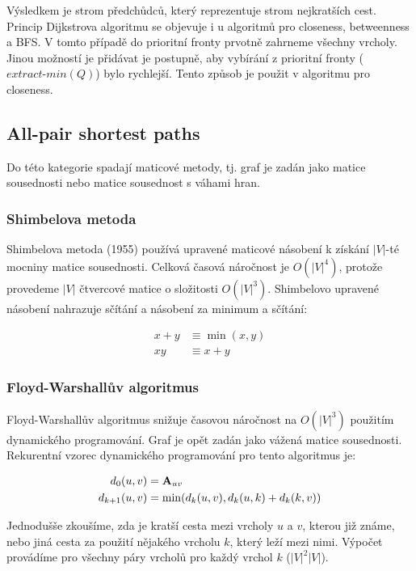 \documentclass[12pt,titlepage]{report}
\begin{document}
Výsledkem je strom předchůdců, který reprezentuje strom nejkratších cest.
Princip Dijkstrova algoritmu se objevuje i u algoritmů pro closeness,
betweenness a BFS. V tomto případě do prioritní fronty prvotně zahrneme všechny
vrcholy. Jinou možností je přidávat je postupně, aby vybírání z prioritní
fronty ($extract\mbox{-}min(Q)$) bylo rychlejší. Tento způsob je použit v
algoritmu pro closeness.


\subsection{All-pair shortest paths}
Do této kategorie spadají maticové metody, tj. graf je zadán jako matice
sousednosti nebo matice sousednost s váhami hran.


\subsubsection{Shimbelova metoda}
Shimbelova metoda (1955) používá upravené maticové násobení k získání $|V|$-té
mocniny matice sousednosti. Celková časová náročnost je $O(|V|^4)$, protože
provedeme $|V|$  čtvercové matice o složitosti $O(|V|^3)$.
Shimbelovo upravené násobení nahrazuje sčítání a násobení za minimum a sčítání:

\begin{align*}
x + y &\equiv \min(x, y) \\
xy &\equiv x + y
\end{align*}

\subsubsection{Floyd-Warshallův algoritmus}
Floyd-Warshallův algoritmus snižuje časovou náročnost na $O(|V|^3)$
použitím dynamického programování. Graf je opět zadán jako vážená matice
sousednosti. Rekurentní vzorec dynamického programování pro tento algoritmus je:

\begin{align*}
d_0(u, v) &= {\bf A}_{uv} \\
d_{k + 1}(u, v) &= \min(d_k(u, v), d_k(u, k) + d_k(k, v)) \\
\end{align*}

Jednodušše zkoušíme, zda je kratší cesta mezi vrcholy $u$ a $v$, kterou již
známe, nebo jiná cesta za použití nějakého vrcholu $k$, který leží mezi nimi.
Výpočet provádíme pro všechny páry vrcholů pro každý vrchol $k$ ($|V|^2 |V|$).
\end{document}
